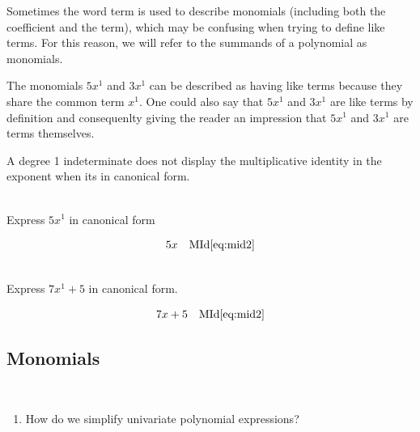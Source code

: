 Sometimes the word \alert{term} is used to describe monomials (including both the coefficient and the term), which may be confusing when trying to define like terms.  For this reason, we will refer to the summands of a polynomial as monomials. 

The monomials $5x^1$ and $3x^1$ can be described as having like terms because they share the common term $x^1$.  One could also say that $5x^1$ and $3x^1$ are like terms by definition and consequenlty giving the reader an impression that $5x^1$ and $3x^1$ are terms themselves.

\begin{remark}
A degree 1 indeterminate does not display the multiplicative identity in the exponent when its in canonical form. 
\end{remark}

\begin{example}[id:20141120-202042] \label{20141120-202042} \hfill \\

Express $5x^1$ in canonical form

\soln

\solnsteps
\begin{align*}
5x && \text{MId} \eqref{eq:mid2} 
\end{align*}
\end{example}

\begin{example}[id:20141121-093439] \label{20141121-093439} \hfill \\

Express $7x^1+5$ in canonical form.

\soln

\solnsteps
\begin{align*}
7x+5 && \text{MId} \eqref{eq:mid2} \\
\end{align*}
\end{example}

\subsection*{Monomials}

\begin{essentialq}\hfill \\

\begin{enumerate}
	\item How do we simplify univariate polynomial expressions?
\end{enumerate}

\end{essentialq}

